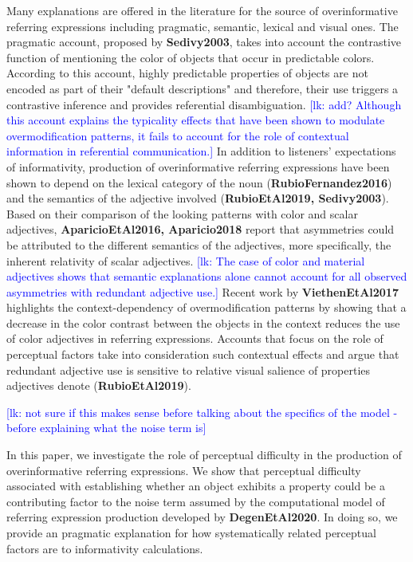 \documentclass[12pt,letterpaper]{article}
\newcommand{\lk}[1]{\textcolor{Blue}{[lk: #1]}}
\newcommand{\citeA}{\textbf}
\begin{document}
Many explanations are offered in the literature for the source of overinformative referring expressions including pragmatic, semantic, lexical and visual ones. The pragmatic account, proposed by \citeA{Sedivy2003}, takes into account the contrastive function of mentioning the color of objects that occur in predictable colors. According to this account, highly predictable properties of objects are not encoded as part of their "default descriptions" and therefore, their use triggers a contrastive inference and provides referential disambiguation. \lk{add? Although this account explains the typicality effects that have been shown to modulate overmodification patterns, it fails to account for the role of contextual information in referential communication.} In addition to listeners' expectations of informativity, production of overinformative referring expressions have been shown to depend on the lexical category of the noun (\citeA{RubioFernandez2016}) and the semantics of the adjective involved (\citeA{RubioEtAl2019, Sedivy2003}). Based on their comparison of the looking patterns with color and scalar adjectives, \citeA{AparicioEtAl2016, Aparicio2018} report that asymmetries could be attributed to the different semantics of the adjectives, more specifically, the inherent relativity of scalar adjectives. \lk{The case of color and material adjectives shows that semantic explanations alone cannot account for all observed asymmetries with redundant adjective use.} Recent work by \citeA{ViethenEtAl2017} highlights the context-dependency of overmodification patterns by showing that a decrease in the color contrast between the objects in the context reduces the use of color adjectives in referring expressions. Accounts that focus on the role of perceptual factors take into consideration such contextual effects and argue that redundant adjective use is sensitive to relative visual salience of properties adjectives denote (\citeA{RubioEtAl2019}). 

\lk{not sure if this makes sense before talking about the specifics of the model - before explaining what the noise term is}

In this paper, we investigate the role of perceptual difficulty in the production of overinformative referring expressions. We show that perceptual difficulty associated with establishing whether an object exhibits a property could be a contributing factor to the noise term assumed by the computational model of referring expression production developed by \citeA{DegenEtAl2020}. In doing so, we provide an pragmatic explanation for how systematically related perceptual factors are to informativity calculations.
\end{document}
